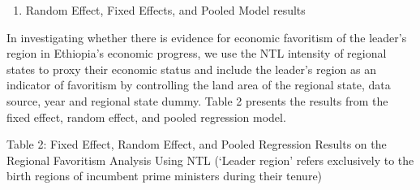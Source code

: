 \begin{enumerate}
\def\labelenumi{\arabic{enumi}.}
\setcounter{enumi}{1}
\item
  Random Effect, Fixed Effects, and Pooled Model results
\end{enumerate}

In investigating whether there is evidence for economic favoritism of
the leader's region in Ethiopia's economic progress, we use the NTL
intensity of regional states to proxy their economic status and include
the leader's region as an indicator of favoritism by controlling the
land area of the regional state, data source, year and regional state
dummy. Table 2 presents the results from the fixed effect, random
effect, and pooled regression model.

Table 2: Fixed Effect, Random Effect, and Pooled Regression Results on
the Regional Favoritism Analysis Using NTL (`Leader region' refers
exclusively to the birth regions of incumbent prime ministers during
their tenure)

